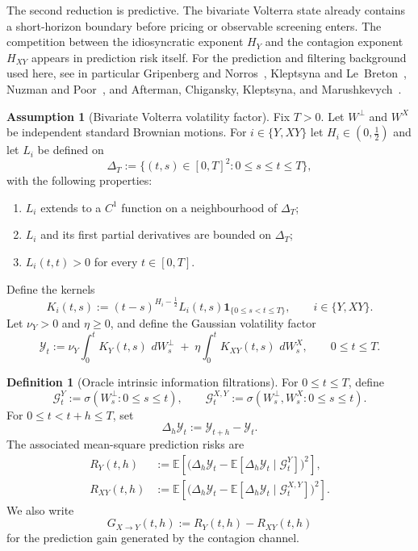 \documentclass[11pt,a4paper]{amsart}
\theoremstyle{plain}
\theoremstyle{definition}
\newtheorem{definition}[theorem]{Definition}
\newtheorem{assumption}[theorem]{Assumption}
\theoremstyle{remark}
\newcommand{\EE}{\mathbb{E}}
\newcommand{\dd}{\,d}
\newcommand{\one}{\mathbf 1}
\begin{document}
The second reduction is predictive.  The bivariate Volterra state already contains a short-horizon
boundary before pricing or observable screening enters.  The competition between the idiosyncratic
exponent $H_Y$ and the contagion exponent $H_{XY}$ appears in prediction risk itself.  For the
prediction and filtering background used here, see in particular Gripenberg and Norros~\cite{GN96},
Kleptsyna and Le~Breton~\cite{KLB02}, Nuzman and Poor~\cite{NP00}, and Afterman, Chigansky,
Kleptsyna, and Marushkevych~\cite{ACKM22}.

\begin{assumption}[Bivariate Volterra volatility factor]\label{ass:model}
Fix $T>0$. Let $W^\perp$ and $W^X$ be independent standard Brownian motions. For
$i\in\{Y,XY\}$ let $H_i\in(0,\tfrac12)$ and let $L_i$ be defined on
\[
\Delta_T:=\{(t,s)\in[0,T]^2:0\le s\le t\le T\},
\]
with the following properties:
\begin{enumerate}[label=(\roman*)]
\item $L_i$ extends to a $C^1$ function on a neighbourhood of $\Delta_T$;
\item $L_i$ and its first partial derivatives are bounded on $\Delta_T$;
\item $L_i(t,t)>0$ for every $t\in[0,T]$.
\end{enumerate}
Define the kernels
\[
K_i(t,s):=(t-s)^{H_i-\frac12}L_i(t,s)\one_{\{0\le s<t\le T\}},
\qquad i\in\{Y,XY\}.
\]
Let $\nu_Y>0$ and $\eta\ge0$, and define the Gaussian volatility factor
\begin{equation}\label{eq:Yfactor}
\mathcal Y_t
:=
\nu_Y\int_0^t K_Y(t,s)\,\dd W_s^\perp
\;+\;
\eta\int_0^t K_{XY}(t,s)\,\dd W_s^X,
\qquad 0\le t\le T.
\end{equation}
\end{assumption}

\begin{definition}[Oracle intrinsic information filtrations]\label{def:intrinsic-filtrations}
For $0\le t\le T$, define
\[
\mathcal G_t^Y:=\sigma(W_s^\perp:0\le s\le t),
\qquad
\mathcal G_t^{X,Y}:=\sigma(W_s^\perp,W_s^X:0\le s\le t).
\]
For $0\le t<t+h\le T$, set
\[
\Delta_h \mathcal Y_t := \mathcal Y_{t+h}-\mathcal Y_t.
\]
The associated mean-square prediction risks are
\begin{align}
R_Y(t,h)
&:=
\EE\!\left[
\bigl(\Delta_h\mathcal Y_t-\EE[\Delta_h\mathcal Y_t\mid \mathcal G_t^Y]\bigr)^2
\right], \label{eq:RY}\\
R_{XY}(t,h)
&:=
\EE\!\left[
\bigl(\Delta_h\mathcal Y_t-\EE[\Delta_h\mathcal Y_t\mid \mathcal G_t^{X,Y}]\bigr)^2
\right]. \label{eq:RXY}
\end{align}
We also write
\begin{equation}\label{eq:gain}
G_{X\to Y}(t,h):=R_Y(t,h)-R_{XY}(t,h)
\end{equation}
for the prediction gain generated by the contagion channel.
\end{definition}
\end{document}
